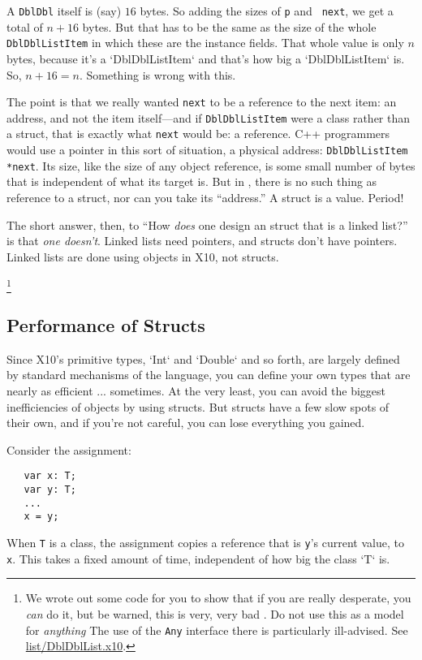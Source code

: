 A {\tt DblDbl}
itself is (say) {$16$} bytes. So adding the sizes of {\tt p} and {\tt
next}, we get a total of $n+16$ bytes.
But that has to be the same as the size of the whole {\tt DblDblList\-Item} in
which these are the instance fields. That whole value is only {$n$} bytes, 
because it's a \xcd`DblDblListItem` and that's how big a \xcd`DblDblListItem`
is.  So, {$n+16=n$}.   Something is wrong with this.

The point is that we really wanted {\tt next} to be a reference to the next
item: an address, and not the item itself---and if {\tt DblDbl\-List\-Item}
were a class rather than a struct, that is exactly what {\tt next} would be: a
reference. C++ programmers would use a pointer in this sort of situation, a
physical address: {\tt DblDbl\-List\-Item *next}. Its size, like the size of
any object reference, is some small number of bytes that is independent of
what its target is. But in \Xten, there is no such thing as reference to a
struct, nor can you take its ``address.'' A struct is a value. Period!

The short answer, then, to ``How {\em does} one design an \Xten{} struct that
is a linked list?'' is that {\em one doesn't}. Linked lists need pointers, and
structs don't have pointers.  Linked lists are done using objects in X10, not
structs. 


\footnote{
We wrote out some code for you to show that if you are really desperate, you 
{\em can} do it, but be warned, this is very, very bad \Xten.  Do not use this
as a model for {\em anything}  The use of the {\tt Any} interface there is
particularly ill-advised. See 
\href{http://dist.codehaus.org/x10/documentation/guide/src/list/DblDblList.x10}{list/DblDblList.x10}.
}

\subsection{Performance of Structs}

Since X10's primitive types, \xcd`Int` and \xcd`Double` and so forth, are
largely defined by standard mechanisms of the language, you can define your
own types that are nearly as efficient ... sometimes.  At the very least, you
can avoid the biggest inefficiencies of objects by using structs.  But structs
have a few slow spots of their own, and if you're not careful, you can lose
everything you gained.

Consider the assignment: 
\begin{verbatim}
   var x: T;
   var y: T;
   ...
   x = y;
\end{verbatim}
When {\tt T} is a class, the assignment copies a reference that is {\tt y}'s
current value, to {\tt x}.  This takes a fixed amount of time, independent of
how big the class \xcd`T` is.  

